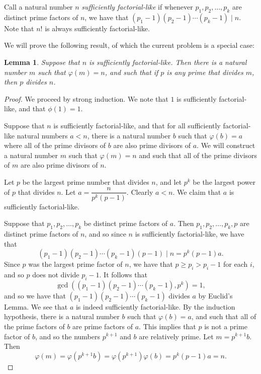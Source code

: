 \documentclass{article}
\newtheorem*{lemma}{Lemma}
\begin{document}
\begin{enumerate}[1.]
Call a natural number $n$ \emph{sufficiently factorial-like} if whenever $p_1, p_2, \dots, p_k$ are distinct prime factors of $n$, we have that $(p_1 - 1)(p_2 - 1) \dotsb (p_k - 1) \mid n$. Note that $n!$ is always sufficiently factorial-like.

We will prove the following result, of which the current problem is a special case:
\begin{lemma}
	Suppose that $n$ is sufficiently factorial-like. Then there is a natural number $m$ such that $\varphi(m) = n$, and such that if $p$ is any prime that divides $m$, then $p$ divides $n$.
\end{lemma}
\begin{proof}
	We proceed by strong induction. We note that $1$ is sufficiently factorial-like, and that $\phi(1) = 1$.

	Suppose that $n$ is sufficiently factorial-like, and that for all sufficiently factorial-like natural numbers $a < n$, there is a natural number $b$ such that $\varphi(b) = a$ where all of the prime divisors of $b$ are also prime divisors of $a$. We will construct a natural number $m$ such that $\varphi(m) = n$ and such that all of the prime divisors of $m$ are also prime divisors of $n$.

	Let $p$ be the largest prime number that divides $n$, and let $p^k$ be the largest power of $p$ that divides $n$. Let $a = \dfrac{n}{p^k(p - 1)}$. Clearly $a < n$. We claim that $a$ is sufficiently factorial-like.

	Suppose that $p_1, p_2, \dots, p_k$ be distinct prime factors of $a$. Then $p_1, p_2, \dots, p_k, p$ are distinct prime factors of $n$, and so since $n$ is sufficiently factorial-like, we have that
	\[
		(p_1 - 1)(p_2 - 1) \dotsb (p_k - 1)(p - 1) \mid n = p^k(p - 1) a.
	\]
	Since $p$ was the largest prime factor of $n$, we have that $p \geq p_i > p_i - 1$ for each $i$, and so $p$ does not divide $p_i - 1$. It follows that
	\[
		\gcd((p_1 - 1)(p_2 - 1) \dotsb (p_k - 1), p^k) = 1,
	\]
	and so we have that $(p_1 - 1)(p_2 - 1) \dotsb (p_k - 1)$ divides $a$ by Euclid's Lemma. We see that $a$ is indeed sufficiently factorial-like. By the induction hypothesis, there is a natural number $b$ such that $\varphi(b) = a$, and such that all of the prime factors of $b$ are prime factors of $a$. This implies that $p$ is not a prime factor of $b$, and so the numbers $p^{k + 1}$ and $b$ are relatively prime. Let $m = p^{k + 1} b$. Then
	\[
		\varphi(m) = \varphi\left(p^{k + 1} b\right) = \varphi\left(p^{k + 1}\right) \varphi(b) = p^k (p - 1) a = n.
	\]


\end{proof}
\end{enumerate}
\end{document}
